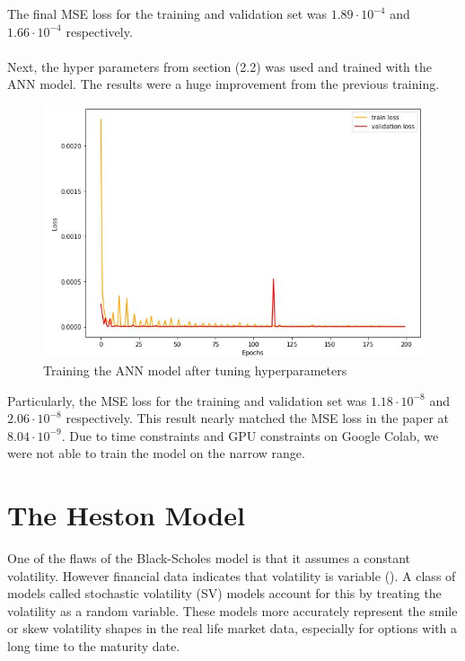 \documentclass[12pt,a4paper]{article}
\begin{document}
The final MSE loss for the training and validation set was $1.89 \cdot 10^{-4}$ and $1.66 \cdot 10^{-4}$ respectively.\\\\
Next, the hyper parameters from section (2.2) was used and trained with the ANN model. The results were a huge improvement from the previous training.
\begin{figure}[H]
    \centering
    \includegraphics[scale=0.8]{Best learning rate and tuned hyperparameter for ANN for wide range.JPG}
    \caption{Training the ANN model after tuning hyperparameters}
\end{figure}
Particularly, the MSE loss for the training and validation set was $1.18\cdot 10^{-8}$ and $2.06 \cdot 10^{-8}$ respectively. This result nearly matched the MSE loss in the paper at $8.04 \cdot 10^{-9}$. Due to time constraints and GPU constraints on Google Colab, we were not able to train the model on the narrow range.

\section{The Heston Model}
One of the flaws of the Black-Scholes model is that it assumes a constant volatility. However financial data indicates that volatility is variable (\cite{risks7010016}). A class of models called stochastic volatility (SV) models account for this by treating the volatility as a random variable. These models more accurately represent the smile or skew volatility shapes in the real life market data, especially for options with a long time to the maturity date.
\end{document}
